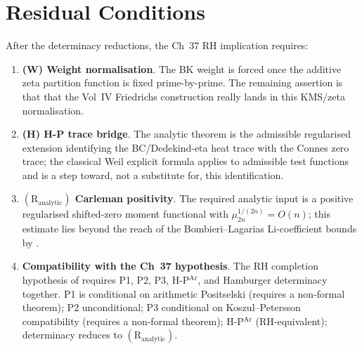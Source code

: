 \section{Residual Conditions}
\label{v4-arith:hpar-det:residuals}

After the determinacy reductions, the Ch~37 RH implication requires:

\begin{enumerate}
\item \textbf{(W) Weight normalisation}. The BK weight is forced once
the additive zeta partition function is fixed prime-by-prime. The
remaining assertion is that that the Vol~IV Friedrichs construction
really lands in this KMS/zeta normalisation.
\item \textbf{(H) H-P trace bridge}. The analytic theorem is the
admissible regularised extension identifying the BC/Dedekind-eta heat
trace with the Connes zero trace; the classical Weil explicit formula
applies to admissible test functions and is a step toward, not a
substitute for, this identification.
\item \textbf{\((\mathrm{R}_{\mathrm{analytic}})\) Carleman positivity}.
The required analytic input is a positive regularised shifted-zero
moment functional with \(\mu_{2n}^{1/(2n)}=O(n)\); this estimate
lies beyond the reach of the Bombieri--Lagarias Li-coefficient bounds
by .
\item \textbf{Compatibility with the Ch~37 hypothesis}. The RH completion
hypothesis of  requires P1, P2,
P3, H-P\(^{\mathrm{Ar}}\), and Hamburger determinacy together. P1 is
conditional on arithmetic Positselski (requires a non-formal theorem); P2
unconditional; P3 conditional on Koszul--Petersson compatibility
(requires a non-formal theorem); H-P\(^{\mathrm{Ar}}\)
(RH-equivalent); determinacy reduces to
\((\mathrm{R}_{\mathrm{analytic}})\).
\end{enumerate}

